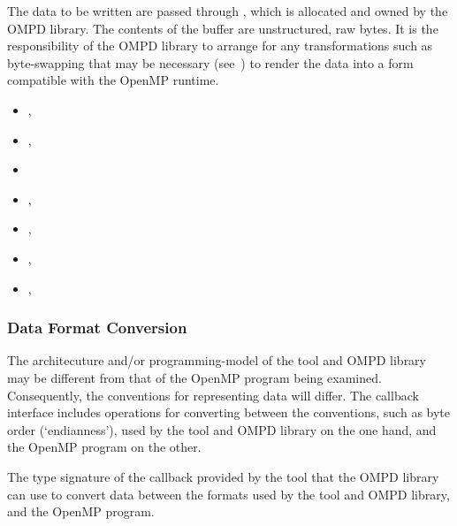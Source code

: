 The data to be written are passed through , which is allocated and
owned by the OMPD library.
The contents of the buffer are unstructured, raw bytes.
It is the responsibility of the OMPD library to arrange for
any transformations such as byte-swapping that may be necessary
(see~)
to render the data into a form compatible with the OpenMP runtime.

\crossreferences
\begin{itemize}
\item
  , 
\item
  , 
\item
   
\item
  , 
\item
  , 
\item
  , 
\item
  , 
\end{itemize}

\subsubsection{Data Format Conversion}
\label{subsubsec:data-format-conversion}

The architecuture and/or programming-model of the tool and
OMPD library may be different from that of the OpenMP program being
examined.
Consequently, the conventions for representing data will differ.
The callback interface includes operations for converting between
the conventions, such as byte order (`endianness'),
used by the tool and OMPD library on the
one hand, and the OpenMP program on the other.

\label{subsubsubsec:ompd_callback_device_host_fn_t}

\summary

The type signature of the callback provided by the tool that the
OMPD library can use to convert data between the formats used by the
tool and OMPD library, and the OpenMP program.


